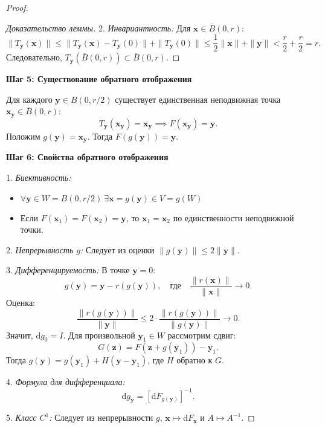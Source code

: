 \begin{proof}
\begin{proof}[Доказательство леммы]
2. \textit{Инвариантность:} Для $\mathbf{x} \in \overline{B}(0, r)$:
\[
\|T_{\mathbf{y}}(\mathbf{x})\| \leq \|T_{\mathbf{y}}(\mathbf{x}) - T_{\mathbf{y}}(0)\| + \|T_{\mathbf{y}}(0)\| \leq \frac{1}{2}\|\mathbf{x}\| + \|\mathbf{y}\| < \frac{r}{2} + \frac{r}{2} = r.
\]
Следовательно, $T_{\mathbf{y}}(\overline{B}(0, r)) \subset \overline{B}(0, r)$.
\end{proof}

\medskip
\textbf{Шаг 5: Существование обратного отображения}

Для каждого $\mathbf{y} \in B(0, r/2)$ существует единственная неподвижная точка $\mathbf{x}_{\mathbf{y}} \in \overline{B}(0, r)$:
\[
T_{\mathbf{y}}(\mathbf{x}_{\mathbf{y}}) = \mathbf{x}_{\mathbf{y}} \implies F(\mathbf{x}_{\mathbf{y}}) = \mathbf{y}.
\]
Положим $g(\mathbf{y}) = \mathbf{x}_{\mathbf{y}}$. Тогда $F(g(\mathbf{y})) = \mathbf{y}$.

\medskip
\textbf{Шаг 6: Свойства обратного отображения}

1. \textit{Биективность:} 
\begin{itemize}
    \item $\forall \mathbf{y} \in W = B(0, r/2) \ \exists \mathbf{x} = g(\mathbf{y}) \in V = g(W)$
    \item Если $F(\mathbf{x}_1) = F(\mathbf{x}_2) = \mathbf{y}$, то $\mathbf{x}_1 = \mathbf{x}_2$ по единственности неподвижной точки.
\end{itemize}

2. \textit{Непрерывность $g$:} Следует из оценки $\|g(\mathbf{y})\| \leq 2\|\mathbf{y}\|$.

3. \textit{Дифференцируемость:} В точке $\mathbf{y}=0$:
\[
g(\mathbf{y}) = \mathbf{y} - r(g(\mathbf{y})), \quad \text{где} \quad \frac{\|r(\mathbf{x})\|}{\|\mathbf{x}\|} \to 0.
\]
Оценка:
\[
\frac{\|r(g(\mathbf{y}))\|}{\|\mathbf{y}\|} \leq 2 \cdot \frac{\|r(g(\mathbf{y}))\|}{\|g(\mathbf{y})\|} \to 0.
\]
Значит, $\mathrm{d}g_{0} = I$. Для произвольной $\mathbf{y}_1 \in W$ рассмотрим сдвиг:
\[
G(\mathbf{z}) = F(\mathbf{z} + g(\mathbf{y}_1)) - \mathbf{y}_1.
\]
Тогда $g(\mathbf{y}) = g(\mathbf{y}_1) + H(\mathbf{y} - \mathbf{y}_1)$, где $H$ обратно к $G$.

4. \textit{Формула для дифференциала:} 
\[
\mathrm{d}g_{\mathbf{y}} = [\mathrm{d}F_{g(\mathbf{y})}]^{-1}.
\]

5. \textit{Класс $C^1$:} Следует из непрерывности $g$, $\mathbf{x} \mapsto \mathrm{d}F_{\mathbf{x}}$ и $A \mapsto A^{-1}$.
\end{proof}

